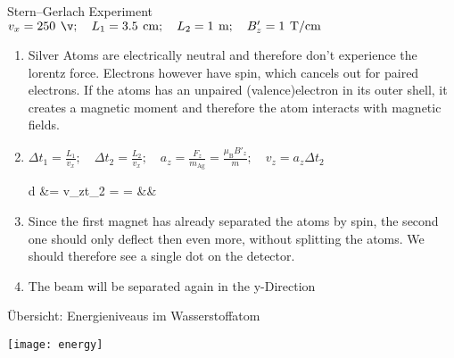\documentclass{alex_hü}
\begin{document}
\renewcommand{\labelenumi}{\alph{enumi})}


\begin{mybox}{Stern–Gerlach Experiment}
	\centering \( v_x = 250 \unit{\v};\quad L_1 = 3.5 \unit{cm};\quad L_2 = 1 \unit{m};\quad B'_z = 1 \unit{T/cm} \)
	\tcblower
	\begin{enumerate}
		\item Silver Atoms are electrically neutral and therefore don't experience the lorentz force. Electrons however have spin, which cancels out for paired electrons. If the atoms has an unpaired (valence)electron in its outer shell, it creates a magnetic moment and therefore the atom interacts with magnetic fields. 
	\tcbline
		\item \( \Delta t_1 = \tfrac{L_1}{v_x};\quad \Delta t_2 = \tfrac{L_2}{v_x};\quad a_z = \tfrac{F_z}{m_{\text{Ag}}} = \tfrac{\mu_{\text{B}} B'_z}{m};\quad v_z = a_z\Delta t_2 \)
		\begin{flalign*}
			d &= v_z\Delta t_2 =  =  &&
		\end{flalign*}
	\tcbline
		\item Since the first magnet has already separated the atoms by spin, the second one should only deflect then even more, without splitting the atoms. We should therefore see a single dot on the detector.
	\tcbline
		\item The beam will be separated again in the y-Direction
	\end{enumerate}
\end{mybox}


\begin{mybox}{Übersicht: Energieniveaus im Wasserstoffatom}
	\begin{minipage}{\textwidth}
		\texttt{[image: energy]}
	\end{minipage}
\end{mybox}
\end{document}
